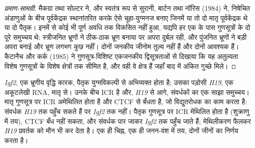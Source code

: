 \begin{proof}[प्रमाण-सामग्री]
मैकग्रा तथा सोल्टर ने, और स्वतंत्र रूप से सुरानी, बार्टन तथा नॉरिस
(1984) ने, निषेचित अंडाणुओं के बीच पूर्वकेंद्रक स्थानांतरित करके ऐसे
चूहा-युग्मनज बनाए जिनमें या तो दो मातृ पूर्वकेंद्रक थे या दो पैतृक।
इनमें से कोई भी पूर्ण अवधि तक विकसित नहीं हुआ, यद्यपि हर एक के पास
गुणसूत्रों के दो पूरे समुच्चय थे: स्त्रीजनित भ्रूणों ने ठीक-ठाक भ्रूण
बनाया पर अपरा दुर्बल रही, और पुंजनित भ्रूणों ने बड़ी अपरा बनाई और
भ्रूण लगभग कुछ नहीं। दोनों जनकीय जीनोम तुल्य नहीं हैं और दोनों
आवश्यक हैं। कैटानैच और कर्क (1985) ने गुणसूत्र-विशिष्ट एकजनकीय
द्विसूत्रताओं से दिखाया कि यह अतुल्यता विशेष गुणसूत्रों के विशेष
क्षेत्रों तक सीमित है, और वही वे क्षेत्र हैं जहाँ बाद में अंकित गुच्छे
मिले।
\end{proof}

\begin{example}\label{ex:b3:chromatin-epigenetics:igf2}
\emph{Igf2}, एक भ्रूणीय वृद्धि कारक, पैतृक युग्मविकल्पी से अभिव्यक्त
होता है; उसका पड़ोसी \emph{H19}, एक अकूटलेखी RNA, मातृ से। उनके बीच
ICR है और, \emph{H19} से आगे, संवर्धकों का एक साझा समुच्चय। मातृ
गुणसूत्र पर ICR अमेथिलित होता है और CTCF से बँधता है, जो विद्युतरोधक
का काम करता है: संवर्धक \emph{H19} तक पहुँच सकते हैं पर \emph{Igf2}
तक नहीं। पैतृक गुणसूत्र पर ICR मेथिलित होता है (शुक्राणु में तय), CTCF
बँध नहीं सकता, और संवर्धक पार जाकर \emph{Igf2} तक पहुँच जाते हैं;
मेथिलीकरण फैलकर \emph{H19} प्रवर्तक को मौन भी कर देता है। एक ही चिह्न,
एक ही जनन-वंश में तय, दोनों जीनों का निर्णय करता है।
\end{example}

